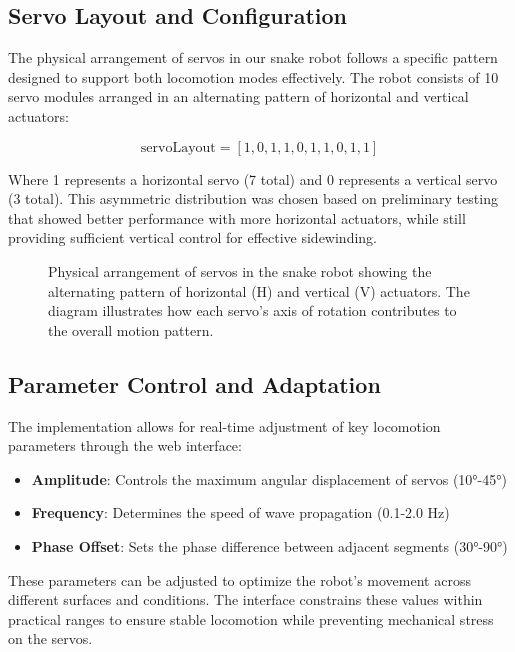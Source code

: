 \documentclass[12pt,a4paper]{report}
\begin{document}
\subsection{Servo Layout and Configuration}
The physical arrangement of servos in our snake robot follows a specific pattern designed to support both locomotion modes effectively. The robot consists of 10 servo modules arranged in an alternating pattern of horizontal and vertical actuators:

\begin{equation}
\text{servoLayout} = [1, 0, 1, 1, 0, 1, 1, 0, 1, 1]
\end{equation}

Where 1 represents a horizontal servo (7 total) and 0 represents a vertical servo (3 total). This asymmetric distribution was chosen based on preliminary testing that showed better performance with more horizontal actuators, while still providing sufficient vertical control for effective sidewinding.

\begin{figure}
  \centering
  
  \caption{Physical arrangement of servos in the snake robot showing the alternating pattern of horizontal (H) and vertical (V) actuators. The diagram illustrates how each servo's axis of rotation contributes to the overall motion pattern.}
  \label{fig:servo-layout}
\end{figure}

\subsection{Parameter Control and Adaptation}
The implementation allows for real-time adjustment of key locomotion parameters through the web interface:

\begin{itemize}
    \item \textbf{Amplitude}: Controls the maximum angular displacement of servos (10°-45°)
    \item \textbf{Frequency}: Determines the speed of wave propagation (0.1-2.0 Hz)
    \item \textbf{Phase Offset}: Sets the phase difference between adjacent segments (30°-90°)
\end{itemize}

These parameters can be adjusted to optimize the robot's movement across different surfaces and conditions. The interface constrains these values within practical ranges to ensure stable locomotion while preventing mechanical stress on the servos.
\end{document}
